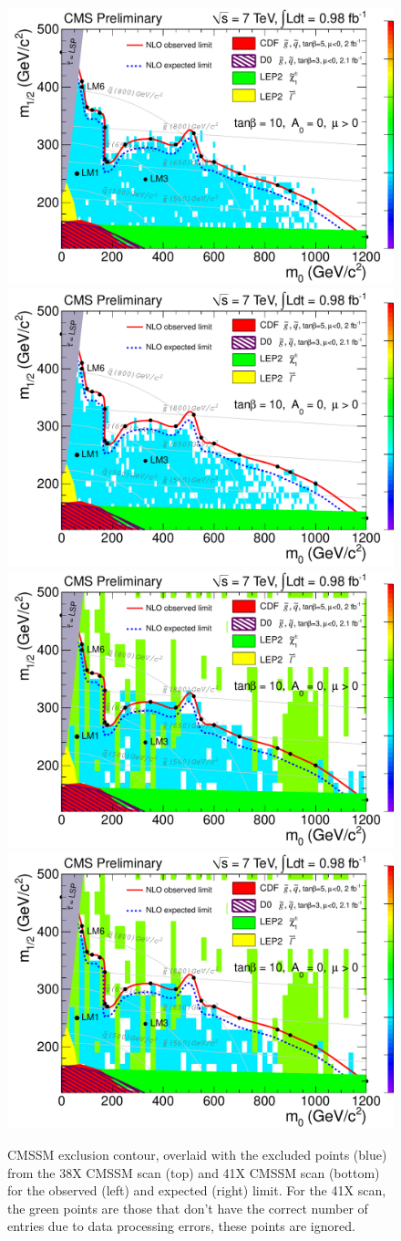 \begin{figure}[hbt]
\begin{center}
\includegraphics[width=0.48\linewidth]{plots/exclusion_old.pdf}
\includegraphics[width=0.48\linewidth]{plots/exclusion_old_exp.pdf}
\includegraphics[width=0.48\linewidth]{plots/exclusion_new.pdf}
\includegraphics[width=0.48\linewidth]{plots/exclusion_new_exp.pdf}
\caption{\label{fig:dilmass}\protect 
CMSSM exclusion contour, overlaid with the excluded points (blue) from the 38X CMSSM scan (top)
and 41X CMSSM scan (bottom) for the observed (left) and expected (right) limit.
For the 41X scan, the green points are those that don't have the correct number of entries due
to data processing errors, these points are ignored.
}
\end{center}
\end{figure}


